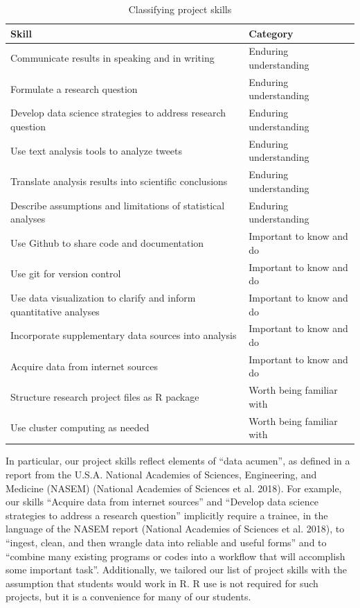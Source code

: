 \documentclass[
]{article}
\begin{document}
\begin{table}

\caption{\label{tab:circle-table}Classifying project skills}
\centering
\begin{tabular}[t]{|>{}l|>{}l|}
\hline
Skill & Category\\
\hline
Communicate results in speaking and in writing & Enduring understanding\\
\hline
Formulate a research question & Enduring understanding\\
\hline
Develop data science strategies to address research question & Enduring understanding\\
\hline
Use text analysis tools to analyze tweets & Enduring understanding\\
\hline
Translate analysis results into scientific conclusions & Enduring understanding\\
\hline
Describe assumptions and limitations of statistical analyses & Enduring understanding\\
\hline
Use Github to share code and documentation & Important to know and do\\
\hline
Use git for version control & Important to know and do\\
\hline
Use data visualization to clarify and inform quantitative analyses & Important to know and do\\
\hline
Incorporate supplementary data sources into analysis & Important to know and do\\
\hline
Acquire data from internet sources & Important to know and do\\
\hline
Structure research project files as R package & Worth being familiar with\\
\hline
Use cluster computing as needed & Worth being familiar with\\
\hline
\end{tabular}
\end{table}

In particular, our project skills reflect elements of ``data acumen'', as defined
in a report from the U.S.A. National Academies of Sciences, Engineering, and Medicine (NASEM) (National Academies of Sciences et al. 2018). For example, our skills ``Acquire data from internet sources'' and
``Develop data science strategies to address a research question'' implicitly require
a trainee, in the language of the NASEM report (National Academies of Sciences et al. 2018), to ``ingest, clean, and then
wrangle data into reliable and useful forms'' and to ``combine many existing programs or codes
into a workflow that will accomplish some important task''. Additionally, we tailored our list
of project skills with the assumption that students would work in R. R use is not required for such projects, but it is a
convenience for many of our students.
\end{document}
